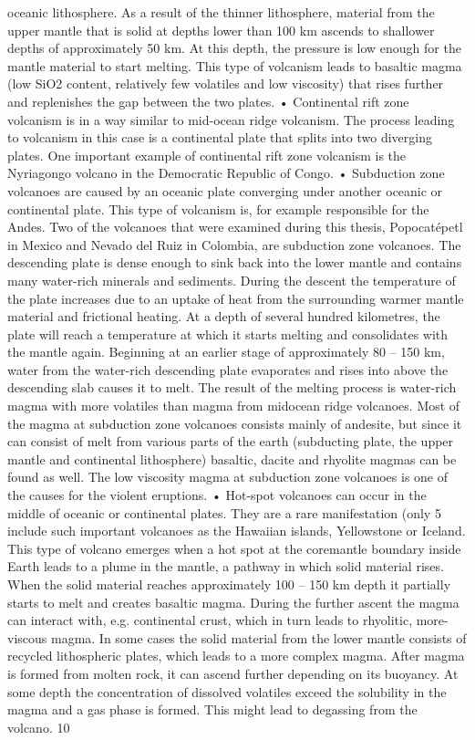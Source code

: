 \documentclass  [
  paper    = a4,
  BCOR     = 10mm,
  twoside,
  fontsize = 12pt,
  fleqn,
  toc      = bibnumbered,
  toc      = listofnumbered,
  numbers  = noendperiod,
  headings = normal,
  listof   = leveldown,
  version  = 3.03
]                                       {scrreprt}
\begin{document}
	oceanic lithosphere. As a result of the thinner lithosphere, material from
	the upper mantle that is solid at depths lower than 100 km ascends to
	shallower depths of approximately 50 km. At this depth, the pressure is low
	enough for the mantle material to start melting. This type of volcanism
	leads to basaltic magma (low SiO2 content, relatively few volatiles and
	low viscosity) that rises further and replenishes the gap between the two
	plates.
	• Continental rift zone volcanism is in a way similar to mid-ocean ridge
	volcanism. The process leading to volcanism in this case is a continental
	plate that splits into two diverging plates. One important example of
	continental rift zone volcanism is the Nyriagongo volcano in the Democratic
	Republic of Congo.
	• Subduction zone volcanoes are caused by an oceanic plate converging under
	another oceanic or continental plate. This type of volcanism is, for example
	responsible for the Andes. Two of the volcanoes that were examined during
	this thesis, Popocatépetl in Mexico and Nevado del Ruiz in Colombia, are
	subduction zone volcanoes. The descending plate is dense enough to sink
	back into the lower mantle and contains many water-rich minerals and
	sediments. During the descent the temperature of the plate increases due
	to an uptake of heat from the surrounding warmer mantle material and
	frictional heating. At a depth of several hundred kilometres, the plate
	will reach a temperature at which it starts melting and consolidates with
	the mantle again. Beginning at an earlier stage of approximately 80 – 150
	km, water from the water-rich descending plate evaporates and rises into
	above the descending slab causes it to melt. The result of the melting
	process is water-rich magma with more volatiles than magma from midocean
	ridge volcanoes. Most of the magma at subduction zone volcanoes
	consists mainly of andesite, but since it can consist of melt from various
	parts of the earth (subducting plate, the upper mantle and continental
	lithosphere) basaltic, dacite and rhyolite magmas can be found as well.
	The low viscosity magma at subduction zone volcanoes is one of the causes
	for the violent eruptions.
	• Hot-spot volcanoes can occur in the middle of oceanic or continental plates.
	They are a rare manifestation (only 5%
	include such important volcanoes as the Hawaiian islands, Yellowstone
	or Iceland. This type of volcano emerges when a hot spot at the coremantle
	boundary inside Earth leads to a plume in the mantle, a pathway in
	which solid material rises. When the solid material reaches approximately
	100 – 150 km depth it partially starts to melt and creates basaltic magma.
	During the further ascent the magma can interact with, e.g. continental
	crust, which in turn leads to rhyolitic, more-viscous magma. In some cases
	the solid material from the lower mantle consists of recycled lithospheric
	plates, which leads to a more complex magma.
	After magma is formed from molten rock, it can ascend further depending on
	its buoyancy. At some depth the concentration of dissolved volatiles exceed the
	solubility in the magma and a gas phase is formed. This might lead to degassing
	from the volcano.
	10
\end{document}
